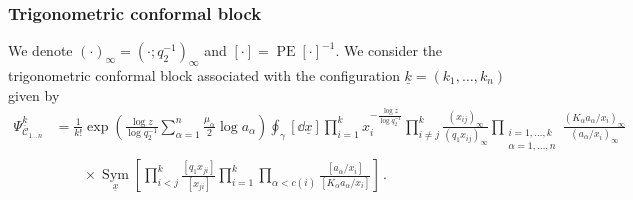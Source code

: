 \subsubsection{Trigonometric conformal block}

We denote $(\cdot)_\infty = (\cdot;q_2^{-1})_\infty$ and $[\cdot] = \operatorname{PE}[\cdot]^{-1}$.
We consider the trigonometric conformal block associated with the configuration $\underline{k}=(k_1,\ldots,k_n)$ given by
\begin{align}
    \Psi_{\mathscr{C}_{1\ldots n}}^{\underline{k}}
    & = \frac{1}{k!} \exp\left( \frac{\log z}{\log q_2^{-1}} \sum_{\alpha=1}^n \frac{\mu_\alpha}{2} \log a_\alpha \right) \oint_\gamma [\dd{\underline{x}}] \prod_{i=1}^k x_i^{-\frac{\log z}{\log q_2^{-1}}} \prod_{i \neq j}^k \frac{(x_{ij})_\infty}{(q_1 x_{ij})_\infty} \prod_{\substack{i=1,\ldots,k \\ \alpha=1,\ldots,n}} \frac{(K_\alpha a_\alpha/x_i)_\infty}{( a_\alpha/x_i)_\infty} 
    \nonumber \\
    & \qquad \times
    \operatorname*{Sym}_{\underline{x}} \left[
    \prod_{i<j}^k \frac{[q_1 x_{ji}]}{[x_{ji}]} 
    \prod_{i=1}^k \prod_{\alpha < c(i)} \frac{[a_\alpha/x_i]}{[K_\alpha a_\alpha / x_i]} \right]
    \, .
\end{align}

